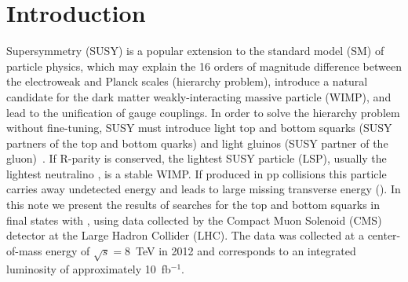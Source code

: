 \section{Introduction}
\label{sec:intro}

Supersymmetry (SUSY) is a popular extension to the standard model (SM) of particle physics, which may explain
the 16 orders of magnitude difference between the electroweak and Planck scales (hierarchy problem), introduce
a natural candidate for the dark matter weakly-interacting massive particle (WIMP), and lead to the unification of
gauge couplings. In order to solve the hierarchy problem without fine-tuning, SUSY must introduce
light top and bottom squarks (SUSY partners of the top and bottom quarks) and light gluinos 
(SUSY partner of the gluon)~\cite{Barbieri:1987fn,deCarlos1993320,Dimopoulos1995573,Barbieri199676,Papucci:2011wy}. 
If R-parity is conserved, the lightest SUSY particle (LSP),
usually the lightest neutralino \lsp, is a stable WIMP. If produced in pp collisions this
particle carries away undetected energy and leads to large missing transverse energy (\met).
In this note we present the results of searches for the top and bottom squarks in final states with \met, 
using data collected by the Compact Muon Solenoid (CMS) detector at the
Large Hadron Collider (LHC). The data was collected at a center-of-mass energy of $\sqrt{s}=8$~TeV in 2012
and corresponds to an integrated luminosity of approximately 10~fb$^{-1}$.

